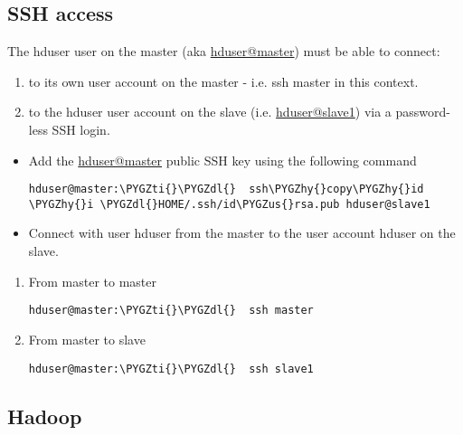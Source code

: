 \documentclass[letterpaper,10pt,english]{sphinxmanual}
\def\PYGZus{\char`\_}
\def\PYGZdl{\char`\$}
\def\PYGZhy{\char`\-}
\def\PYGZti{\char`\~}
\begin{document}
\subsection{SSH access}
\label{hadoop:ssh-access}
The hduser user on the master (aka \href{mailto:hduser@master}{hduser@master}) must be able to connect:
\begin{enumerate}
\item {} 
to its own user account on the master - i.e. ssh master in this context.

\item {} 
to the hduser user account on the slave (i.e. \href{mailto:hduser@slave1}{hduser@slave1}) via a password-less SSH         login.

\end{enumerate}
\begin{itemize}
\item {} 
Add the \href{mailto:hduser@master}{hduser@master} public SSH key using the following command

\begin{Verbatim}[commandchars=\\\{\}]
hduser@master:\PYGZti{}\PYGZdl{}  ssh\PYGZhy{}copy\PYGZhy{}id \PYGZhy{}i \PYGZdl{}HOME/.ssh/id\PYGZus{}rsa.pub hduser@slave1
\end{Verbatim}

\item {} 
Connect with user hduser from the master to the user account hduser on the slave.

\end{itemize}
\begin{enumerate}
\item {} 
From master to master

\begin{Verbatim}[commandchars=\\\{\}]
hduser@master:\PYGZti{}\PYGZdl{}  ssh master
\end{Verbatim}

\item {} 
From master to slave

\begin{Verbatim}[commandchars=\\\{\}]
hduser@master:\PYGZti{}\PYGZdl{}  ssh slave1
\end{Verbatim}

\end{enumerate}


\subsection{Hadoop}
\label{hadoop:hadoop}
\end{document}
